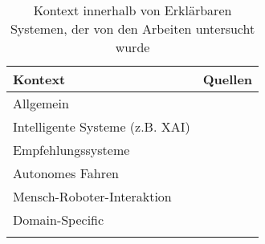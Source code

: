 \begin{longtable}{|p{}|p{}|}
    \hline
    \textbf{Kontext}                    & \textbf{Quellen} \\ \hline
    Allgemein                           &
        \cite{chazette_end-users_nodate} \cite{chazette2020explainability} \cite{chazette_knowledge_nodate} \cite{eiband_impact_2019} \cite{kohl_explainability_2019} \cite{ribera2019can} \cite{lim_2009_assessing} \\
    \hline
    Intelligente Systeme (z.B. XAI)      & 
        \cite{waa_evaluating_2021} \cite{mucha_interfaces_2021} \cite{sokol_explainability_2020}  \cite{abdulrahman_belief-based_2019} \cite{brennen_what_2020} \cite{schaffer_i_2019} \cite{weitz_you_2019} \cite{riveiro_thats_2021} \cite{martin_developing_2019} \cite{martin_evaluating_2021} \cite{rosenfeld_explainability_2019} \cite{cassens_ambient_2019} \cite{cirqueira_scenario-based_2020}  \cite{ehsan_human-centered_2020} \cite{rjoob_towards_2021} \cite{thomson_knowledge--information_2020} \cite{chari_explanation_2020} \cite{sokol_one_2020}  \cite{neerincx_using_2018} \cite{schrills_color_2020} \cite{sovrano_modelling_2020} \cite{gunning2019darpa} \cite{doshi2017towards} \cite{cheng2019explaining}
    \\ \hline
    Empfehlungssysteme                  & 
        \cite{tintarev_designing_nodate} \cite{sato_context_nodate} \cite{balog_measuring_2020}  \cite{kouki_user_2017} \cite{tsai_evaluating_2019} \cite{hernandez-bocanegra_effects_2020} \cite{kunkel_let_2019} \cite{tintarev2015explaining} \cite{sato_action-triggering_2019} \cite{tsai_effects_2020} \cite{nunes_systematic_2017} \cite{tintarev2007survey}
    \\ \hline
    Autonomes Fahren                    &
        \cite{wiegand_id_2020} \cite{haspiel_explanations_2018} \cite{koo_understanding_2016} \cite{koo_why_2015} \cite{wiegand2019drive}
    \\ \hline
    Mensch-Roboter-Interaktion          &
        \cite{stange_effects_2021} \cite{kaptein_personalised_2017} \cite{zolotas_towards_2019} \cite{wang_is_2018} \cite{zhu_effects_2020}
    \\ \hline
    Domain-Specific                     &
        \cite{yamada_evaluating_2016} \cite{zahedi_towards_2019}
    \\ \hline
\caption{Kontext innerhalb von Erklärbaren Systemen, der von den Arbeiten untersucht wurde}
\label{tab:paer_explanation_contexts}
\end{longtable}